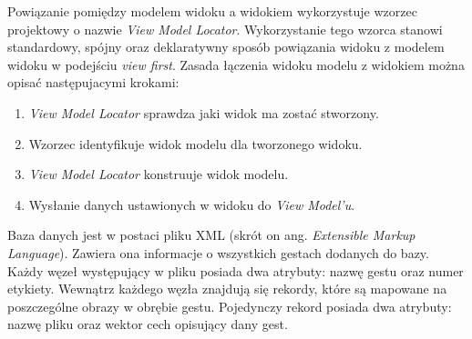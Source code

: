 Powiązanie pomiędzy modelem widoku a widokiem wykorzystuje wzorzec projektowy o nazwie \textit{View Model Locator}. Wykorzystanie tego wzorca stanowi standardowy, spójny oraz deklaratywny sposób powiązania widoku z modelem widoku  w podejściu \textit{view first}. Zasada łączenia widoku modelu z widokiem można opisać następujacymi krokami:
\begin{enumerate}
	\item \textit{View Model Locator} sprawdza jaki widok ma zostać stworzony.
	\item Wzorzec identyfikuje widok modelu dla  tworzonego widoku.
	\item \textit{View Model Locator} konstruuje widok modelu.
	\item Wysłanie danych ustawionych w widoku do \textit{View Model'u}.
\end{enumerate}

Baza danych jest w postaci pliku XML (skrót on ang. \textit{Extensible Markup Language}). Zawiera ona informacje o wszystkich gestach dodanych do bazy. Każdy węzeł występujący w pliku posiada dwa atrybuty: nazwę gestu oraz numer etykiety. Wewnątrz każdego węzła znajdują się rekordy, które są mapowane na  poszczególne obrazy w obrębie gestu. Pojedynczy rekord posiada dwa atrybuty: nazwę pliku oraz wektor cech opisujący dany gest.

